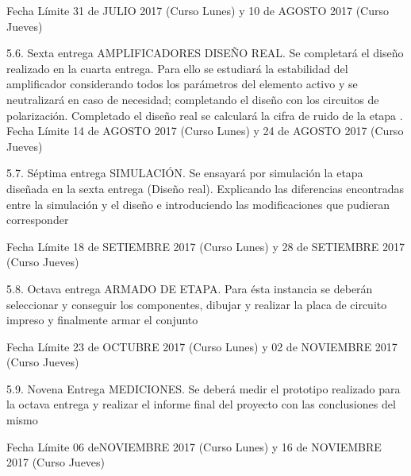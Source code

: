 Fecha Límite 31 de JULIO 2017 (Curso Lunes) y 10 de AGOSTO 2017 (Curso Jueves)

5.6. Sexta entrega
      AMPLIFICADORES DISEÑO REAL. Se completará el diseño realizado en la cuarta entrega. Para ello se estudiará la estabilidad del amplificador considerando todos los parámetros del elemento activo y  se neutralizará en caso de necesidad;  completando el diseño con los circuitos de polarización.
Completado el diseño real se calculará la cifra de ruido de la etapa 
.
Fecha Límite 14 de AGOSTO 2017 (Curso Lunes) y 24 de AGOSTO 2017 (Curso Jueves)

5.7. Séptima entrega
SIMULACIÓN. Se ensayará por simulación la etapa diseñada en la sexta entrega (Diseño real). Explicando las diferencias encontradas entre la simulación y el diseño e introduciendo las modificaciones que pudieran corresponder

Fecha Límite 18 de SETIEMBRE 2017 (Curso Lunes) y 28 de SETIEMBRE 2017 (Curso Jueves)

5.8. Octava entrega
ARMADO DE ETAPA.  Para ésta instancia se deberán seleccionar y conseguir los componentes, dibujar y realizar la placa de circuito impreso y finalmente armar el conjunto

Fecha Límite 23  de OCTUBRE  2017 (Curso Lunes) y 02 de NOVIEMBRE  2017 (Curso Jueves)

5.9. Novena Entrega
MEDICIONES.  Se deberá medir el prototipo realizado para la octava entrega y realizar el informe final del proyecto con las conclusiones del mismo

Fecha Límite 06  deNOVIEMBRE  2017 (Curso Lunes) y 16 de NOVIEMBRE  2017 (Curso Jueves)






